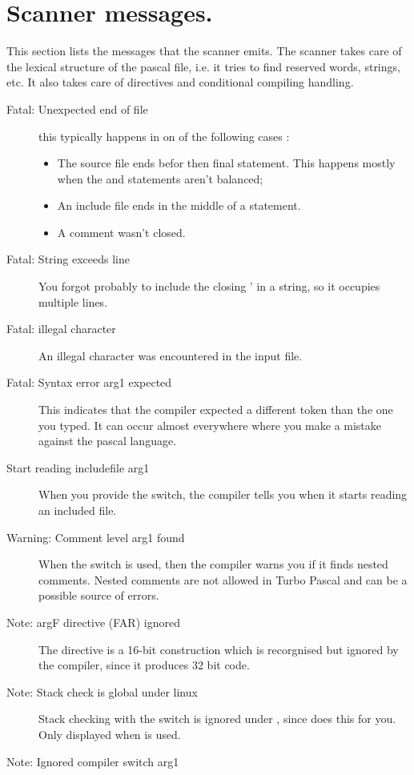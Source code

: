  \section{Scanner messages.}
 This section lists the messages that the scanner emits. The scanner takes
 care of the lexical structure of the pascal file, i.e. it tries to find 
 reserved words, strings, etc. It also takes care of directives and
 conditional compiling handling.
 \begin{description}
\item [Fatal: Unexpected end of file]
 this typically happens in on of the following cases :
 \begin{itemize}
 \item The source file ends befor then final  statement. This
 happens mostly when the  and  statements aren't
 balanced;
 \item An include file ends in the middle of a statement.
 \item A comment wasn't closed.
 \end{itemize}
\item [Fatal: String exceeds line]
 You forgot probably to include the closing ' in a string, so it occupies
 multiple lines. 
\item [Fatal: illegal character]
 An illegal character was encountered in the input file. 
\item [Fatal: Syntax error arg1 expected]
 This indicates that the compiler expected a different token than 
 the one you typed. It can occur almost everywhere where you make a 
 mistake against the pascal language.
\item [Start reading includefile arg1]
 When you provide the  switch, the compiler tells you 
 when it starts reading an included file.
\item [Warning: Comment level arg1 found]
 When the  switch is used, then the compiler warns you if
 it finds nested comments. Nested comments are not allowed in Turbo Pascal
 and can be a possible source of errors.
\item [Note: argF directive (FAR) ignored]
 The  directive is a 16-bit construction which is recorgnised
 but ignored by the compiler, since it produces 32 bit code.
\item [Note: Stack check is global under linux]
 Stack checking with the  switch is ignored under \linux, since
 \linux does this for you. Only displayed when  is used.
\item [Note: Ignored compiler switch arg1]

\end{description}
